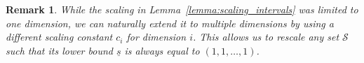 \documentclass{article}
\newtheorem{remark}{Remark}
\newcommand{\mS}{\mathcal{S}}
\begin{document}

	

\begin{remark}
	While the scaling in Lemma~\ref{lemma:scaling_intervals} was limited to one dimension, we can naturally extend it to multiple dimensions by using a different scaling constant \(c_i\) for dimension \(i\). 
	This allows us to rescale any set \(\mS\) such that its lower bound \(\underline{s}\) is always equal to \((1,1,\dots,1)\).
\end{remark}
\end{document}
